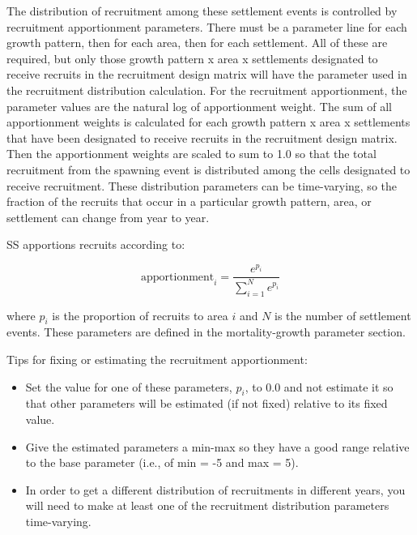 The distribution of recruitment among these settlement events is controlled by recruitment apportionment parameters. There must be a parameter line for each growth pattern, then for each area, then for each settlement. All of these are required, but only those growth pattern x area x settlements designated to receive recruits in the recruitment design matrix will have the parameter used in the recruitment distribution calculation. For the recruitment apportionment, the parameter values are the natural log of apportionment weight. The sum of all apportionment weights is calculated for each growth pattern x area x settlements that have been designated to receive recruits in the recruitment design matrix. Then the apportionment weights are scaled to sum to 1.0 so that the total recruitment from the spawning event is distributed among the cells designated to receive recruitment. These distribution parameters can be time-varying, so the fraction of the recruits that occur in a particular growth pattern, area, or settlement can change from year to year. 

SS apportions recruits according to:

\begin{equation}
	\text{apportionment}_i = \frac{e^{p_i}}{\sum_{i=1}^{N}e^{p_i}}
\end{equation}

where $p_i$ is the proportion of recruits to area $i$ and $N$ is the number of settlement events.  These parameters are defined in the mortality-growth parameter section.  

Tips for fixing or estimating the recruitment apportionment:
\begin{itemize}
	
	\item Set the value for one of these parameters, $p_i$, to 0.0 and not estimate it so that other parameters will be estimated (if not fixed) relative to its fixed value.
	
	\item Give the estimated parameters a min-max so they have a good range relative to the base parameter (i.e., of min = -5 and max = 5).
	
	\item In order to get a different distribution of recruitments in different years, you will need to make at least one of the recruitment distribution parameters time-varying.

\end{itemize}	

